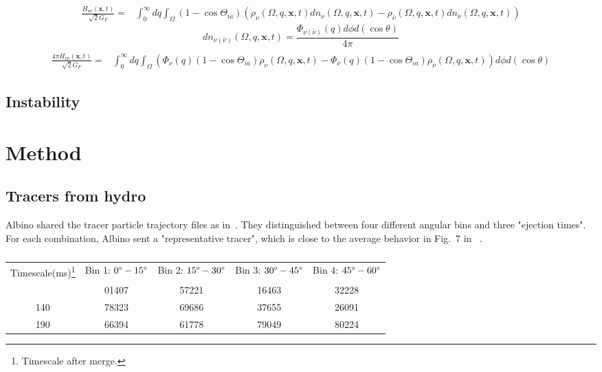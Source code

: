 \documentclass[
reprint,
preprintnumbers,
 amsmath,
 amssymb,
 aps,
onecolumn,
prd,
]{revtex4-2}
\begin{document}
\begin{equation}
\begin{aligned} 
\frac{H_{\nu \nu}(\mathbf{x}, t)}{\sqrt{2} G_{F}}=& \int_{0}^{\infty} d q \int_{\Omega}\left(1-\cos \Theta_{ia}\right)\left(\rho_{\nu}(\Omega, q, \mathbf{x}, t) d n_{\nu}\right.\left.(\Omega, q, \mathbf{x}, t)-\rho_{\bar{\nu}}(\Omega, q, \mathbf{x}, t) d n_{\bar{\nu}}(\Omega, q, \mathbf{x}, t)\right) 
\end{aligned}
\end{equation}
\begin{equation}
d n_{\nu(\bar{\nu})}(\Omega, q, \mathbf{x}, t)=\frac{\Phi_{\nu(\bar{\nu})}(q) d \phi d(\cos \theta)}{4 \pi}
\end{equation}
\begin{equation}
\begin{aligned} 
\\\frac{4 \pi H_{\nu \nu}(\mathbf{x}, t)}{\sqrt{2} G_{F}}=& \int_{0}^{\infty} d q\int_{\Omega} \left( \Phi_{\nu}(q) \left(1-\cos \Theta_{ia}\right) \rho_{\nu}(\Omega, q, \mathbf{x}, t)  -\Phi_{\bar{\nu}}(q) \left(1-\cos \Theta_{ia}\right)  \rho_{\bar{\nu}}(\Omega, q, \mathbf{x}, t) \right)  d \phi d(\cos \theta) 
\end{aligned}
\end{equation}
\subsection{Instability}

\section{Method}
\subsection{Tracers from hydro}
Albino shared the tracer particle trajectory files as in~\citet{Martin2015NEUTRI}.
They distinguished between four different angular bins and three "ejection times".
For each combination, Albino sent a "representative tracer", which is close to the average behavior in Fig.~7 in ~\citet{Martin2015NEUTRI}.
\begin{table}[b]
    \caption{\label{tab:table1}}
    \begin{ruledtabular}
        \begin{tabular}{ccccc}
            \textrm{Timescale(ms)\footnote{Timescale after merge.}}&
            \textrm{Bin 1: $0\degree - 15\degree$}&
            \textrm{Bin 2: $15\degree - 30\degree$} &
            \textrm{Bin 3: $30\degree -45\degree$} &
            \textrm{Bin 4: $45\degree- 60\degree$}\\
            \colrule
            90 & 01407 & 57221 & 16463 & 32228 \\
            140 & 78323 & 69686 & 37655 & 26091 \\
            190 & 66394 & 61778 & 79049 & 80224 \\
        \end{tabular}
    \end{ruledtabular}
\end{table}
\end{document}
